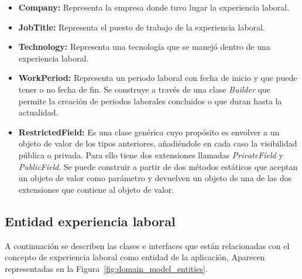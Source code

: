 \documentclass[a4paper, 12pt]{book}
\begin{document}
    \begin{itemize}
        \item \textbf{Company:} Representa la empresa donde tuvo lugar la experiencia laboral.
        \item \textbf{JobTitle:} Representa el puesto de trabajo de la experiencia laboral.
        \item\textbf{Technology:} Representa una tecnología que se manejó dentro de una experiencia laboral.
        \item \textbf{WorkPeriod:} Representa un periodo laboral con fecha de inicio y que puede tener o no fecha de fin. Se construye a través de una clase \emph{Builder} que permite la creación de periodos laborales concluidos o que duran hasta la actualidad.
        \item \textbf{RestrictedField:} Es una clase genérica cuyo propósito es envolver a un objeto de valor de los tipos anteriores, añadiéndole en cada caso la visibilidad pública o privada. Para ello tiene dos extensiones llamadas \emph{PrivateField} y \emph{PublicField}.
        Se puede construir a partir de dos métodos estáticos que aceptan un objeto de valor como parámetro y devuelven un objeto de una de las dos extensiones que contiene al objeto de valor.
    \end{itemize}

    \subsection{Entidad experiencia laboral}
    \label{subsec:work_experience_entity}
    A continuación se describen las clases e interfaces que están relacionadas con el concepto de experiencia laboral como entidad de la aplicación,
    Aparecen representadas en la Figura~\ref{fig:domain_model_entities}.
\end{document}

